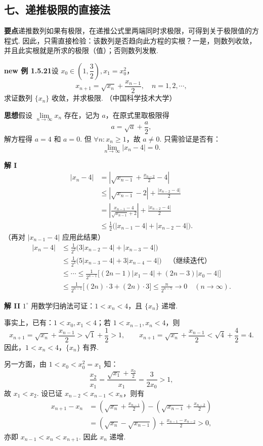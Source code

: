 \documentclass[UTF8,12pt,a4paper,fontset=fandol]{ctexart}
\begin{document}
\subsection*{七、递推极限的直接法}

\noindent\textbf{要点}\quad 递推数列如果有极限，在递推公式里两端同时求极限，可得到关于极限值的方程式. 因此，只需直接检验：该数列是否趋向此方程的实根？一是，则数列收敛，并且此实根就是所求的极限（值）；否则数列发散.

\noindent\textbf{new 例 1.5.21}\quad 设 $x_0\in\left(1,\dfrac32\right),x_1=x_0^2$，
\[
  x_{n+1}=\sqrt{x_n}+\frac{x_{n-1}}2,\quad n=1,2,\cdots,
\]
求证数列 $\{x_n\}$ 收敛，并求极限. （中国科学技术大学）

\noindent\textbf{思想}\quad 假设 $\lim\limits_{n\to\infty}x_n$ 存在，记为 $a$，在原式里取极限得
\[
  a=\sqrt a+\frac a2,
\]
解方程得 $a=4$ 和 $a=0$. 但 $\forall n:x_n\ge 1$，故 $a\ne 0$. 只需验证是否有：
\[
  \lim_{n\to\infty}|x_n-4|=0.
\]

\noindent\textbf{解 I}\quad
\[
\begin{aligned}
  |x_n-4|
  &=\left|\sqrt{x_{n-1}}+\frac{x_{n-2}}2-4\right|\\
  &\le |\sqrt{x_{n-1}}-2|+\frac{|x_{n-2}-4|}{2}\\
  &=\left|\frac{x_{n-1}-4}{\sqrt{x_{n-1}}+2}\right|
    +\frac{|x_{n-2}-4|}{2}\\
  &\le \frac12\bigl(|x_{n-1}-4|+|x_{n-2}-4|\bigr).
\end{aligned}
\]
（再对 $|x_{n-1}-4|$ 应用此结果）
\[
\begin{aligned}
  |x_n-4|
  &\le \frac1{2^2}\bigl(3|x_{n-2}-4|+|x_{n-3}-4|\bigr)\\
  &\le \frac1{2^3}\bigl(5|x_{n-3}-4|+3|x_{n-4}-4|\bigr)
   \quad \text{（继续迭代）}\\
  &\le \cdots \le
   \frac1{2^{n-1}}\bigl[(2n-1)|x_1-4|+(2n-3)|x_0-4|\bigr]\\
  &\le \frac1{2^{n-1}}\bigl[(2n)\cdot 3+(2n)\cdot 3\bigr]
   \le \frac{n}{2^{n-5}}\to 0\quad (n\to\infty).
\end{aligned}
\]

\noindent\textbf{解 II}\quad
$1^\circ$ 用数学归纳法可证：$1<x_n<4$，且 $\{x_n\}$ 递增.

事实上，已有：$1<x_0,x_1<4$；若 $1<x_{n-1},x_n<4$，则
\[
  x_{n+1}=\sqrt{x_n}+\frac{x_{n-1}}2
  >\sqrt1+\frac12>1,\qquad
  x_{n+1}=\sqrt{x_n}+\frac{x_{n-1}}2
  <\sqrt4+\frac42=4.
\]
因此，$1<x_n<4$，$\{x_n\}$ 有界.

另一方面，由 $1<x_0<x_0^2=x_1$ 知：
\[
  \frac{x_2}{x_1}
  =\frac{\sqrt{x_1}+\frac{x_0}{2}}{x_1}
  =\frac{3}{2x_0}>1,
\]
故 $x_1<x_2$. 设已证 $x_{n-2}<x_{n-1}<x_n$，则有
\[
\begin{aligned}
  x_{n+1}-x_n
  &=\left(\sqrt{x_n}+\frac{x_{n-1}}2\right)
    -\left(\sqrt{x_{n-1}}+\frac{x_{n-2}}2\right)\\
  &=(\sqrt{x_n}-\sqrt{x_{n-1}})
    +\frac{x_{n-1}-x_{n-2}}2>0,
\end{aligned}
\]
亦即 $x_{n-1}<x_n<x_{n+1}$. 因此 $x_n$ 递增.
\end{document}
